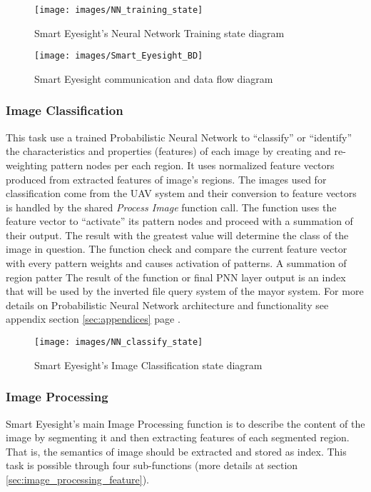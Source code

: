 \documentclass[12pt]{article}
\begin{document}
\begin{figure}[!h]\centering
  \texttt{[image: images/NN\_training\_state]}
  \caption{Smart Eyesight's Neural Network Training state diagram}
  \label{fig:NN_training_state}
\end{figure}

\begin{figure}[!h]\centering
  \texttt{[image: images/Smart\_Eyesight\_BD]}
  \caption{Smart Eyesight communication and data flow diagram}
  \label{fig:function-block-diagram}
\end{figure}

\subsubsection{Image Classification}
\label{sec:image_classification_function}
This task use a trained Probabilistic Neural Network to ``classify''
or ``identify'' the characteristics and properties (features) of each
image by creating and re-weighting pattern nodes per each region. It
uses normalized feature vectors produced from extracted features of
image's regions. The images used for classification come from the UAV
system and their conversion to feature vectors is handled by the
shared \textit{Process Image} function call. The function uses the
feature vector to ``activate'' its pattern nodes and proceed with a
summation of their output. The result with the greatest value will
determine the class of the image in question. The function check and
compare the current feature vector with every pattern weights and
causes activation of patterns. A summation of region patter The result
of the function or final PNN layer output is an index that will be
used by the inverted file query system of the mayor system. For more
details on Probabilistic Neural Network architecture and functionality
see appendix section \ref{sec:appendices} page
\pageref{pnn_architecture}.

\begin{figure}[!h]\centering
  \texttt{[image: images/NN\_classify\_state]}
  \caption{Smart Eyesight's Image Classification state diagram}
  \label{fig:NN_classify_state}
\end{figure}

\subsubsection{Image Processing}
\label{sec:image_processing_function}
Smart Eyesight's main Image Processing function is to describe the
content of the image by segmenting it and then extracting features of
each segmented region. That is, the semantics of image should be
extracted and stored as index. This task is possible through four
sub-functions (more details at section
\ref{sec:image_processing_feature}).
\end{document}
